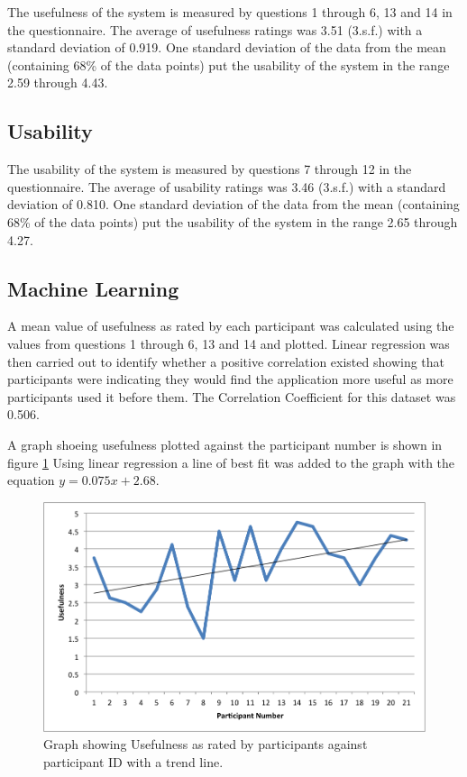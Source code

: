 \documentclass[authoryearcitations]{UoYCSproject}
\begin{document}
The usefulness of the system is measured by questions 1 through 6, 13 and 14 in the questionnaire. The average of usefulness ratings was 3.51 (3.s.f.) with a standard deviation of 0.919. One standard deviation of the data from the mean (containing 68\% of the data points) put the usability of the system in the range 2.59 through 4.43.

\subsection{Usability}
\label{subsec:resultsUsability}

The usability of the system is measured by questions 7 through 12 in the questionnaire.  The average of usability ratings was 3.46 (3.s.f.) with a standard deviation of 0.810. One standard deviation of the data from the mean (containing 68\% of the data points) put the usability of the system in the range 2.65 through 4.27.

\subsection{Machine Learning}
\label{subsec:resultsMachineLearning}

A mean value of usefulness as rated by each participant was calculated using the values from questions 1 through 6, 13 and 14 and plotted. Linear regression was then carried out to identify whether a positive correlation existed showing that participants were indicating they would find the application more useful as more participants used it before them. The Correlation Coefficient for this dataset was 0.506.

A graph shoeing usefulness plotted against the participant number is shown in figure \ref{fig:usefulnessTrend} Using linear regression a line of best fit was added to the graph with the equation $y = 0.075 x + 2.68$.

\begin{figure}[htb] 
\includegraphics[width=\linewidth]{usefulnessTrend}
\caption{Graph showing Usefulness as rated by participants against participant ID with a trend line.}
\label{fig:usefulnessTrend}
\end{figure}
\end{document}
